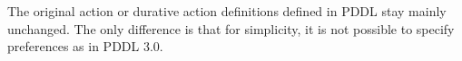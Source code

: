 \documentclass[letterpaper]{article} %
\begin{document}
%
%
The original action or durative action definitions defined in PDDL stay mainly unchanged. The only difference is that for simplicity, it is not possible to specify preferences as in PDDL 3.0.



%
%



%
%

\end{document}
